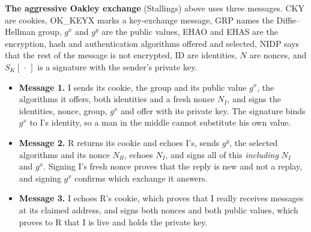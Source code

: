 \begin{center}
\end{center}
\textbf{The aggressive Oakley exchange} (Stallings) above uses three messages. CKY are cookies, OK\_KEYX marks a key-exchange message, GRP names the Diffie--Hellman group, $g^x$ and $g^y$ are the public values, EHAO and EHAS are the encryption, hash and authentication algorithms offered and selected, NIDP says that the rest of the message is not encrypted, ID are identities, $N$ are nonces, and $S_K[\,\cdot\,]$ is a signature with the sender's private key.
\begin{itemize}
  \item \textbf{Message 1.} I sends its cookie, the group and its public value $g^x$, the algorithms it offers, both identities and a fresh nonce $N_I$, and signs the identities, nonce, group, $g^x$ and offer with its private key. The signature binds $g^x$ to I's identity, so a man in the middle cannot substitute his own value.
  \item \textbf{Message 2.} R returns its cookie and echoes I's, sends $g^y$, the selected algorithms and its nonce $N_R$, echoes $N_I$, and signs all of this \emph{including} $N_I$ and $g^x$. Signing I's fresh nonce proves that the reply is new and not a replay, and signing $g^x$ confirms which exchange it answers.
  \item \textbf{Message 3.} I echoes R's cookie, which proves that I really receives messages at its claimed address, and signs both nonces and both public values, which proves to R that I is live and holds the private key.
\end{itemize}
